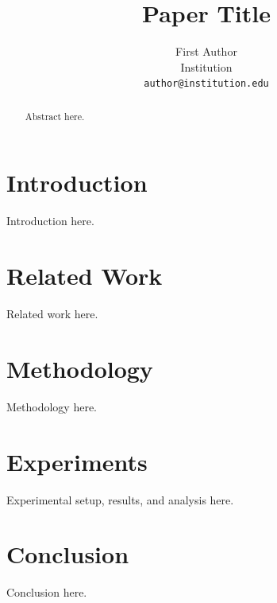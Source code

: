 \documentclass[10pt,twocolumn,letterpaper]{article}
\title{Paper Title}
\author{First Author\\
Institution\\
{\tt\small author@institution.edu}
}
\begin{document}
\maketitle

\begin{abstract}
Abstract here.
\end{abstract}

\section{Introduction}
\label{sec:intro}
Introduction here.

\section{Related Work}
\label{sec:related_work}
Related work here.

\section{Methodology}
\label{sec:method}
Methodology here.

\section{Experiments}
\label{sec:experiments}
Experimental setup, results, and analysis here.

\section{Conclusion}
\label{sec:conclusion}
Conclusion here.

{
    \small
    
    
}

\end{document}
